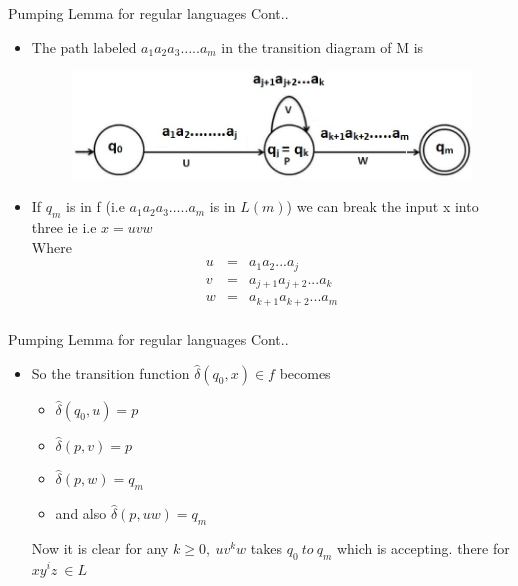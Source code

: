 \documentclass{beamer}
\begin{document}
\begin{frame}{Pumping Lemma for regular languages }
	\proofname Cont..\\
	\begin{itemize}
		\item The path labeled $a_1a_2a_3…..a_m $ in the transition diagram of M is 
		\begin{figure}
			\includegraphics[scale=.5]{img2/m9}
		\end{figure}
		\item If $q_m$ is in f (i.e $a_1a_2a_3…..a_m $ is in $L(m)$) we can break the input x into three ie i.e $x=uvw$\\Where	
		\begin{eqnarray*}
			u &=& a_1a_2...a_j\\
			v &=& a_{j+1}a_{j+2}...a_k\\
			w &=& a_{k+1}a_{k+2}...a_m\\
		\end{eqnarray*}

	\end{itemize}
\end{frame}
\begin{frame}{Pumping Lemma for regular languages }
	\proofname Cont..\\
	\begin{itemize}
		\item 	So the transition function $\hat{\delta}(q_0,x) \in f$  becomes 
		\begin{itemize}
			\item $\hat{\delta}(q_0,u) = p$ 
			\item $\hat{\delta}(p,v) = p$ 
			\item $\hat{\delta}(p,w) = q_m$ 
			\item and also $\hat{\delta}(p,uw) = q_m$ 
		\end{itemize}
		Now it is clear for any $k \geq 0 ,\  uv^kw $ takes $q_0\  to\  q_m$  which is accepting. there for $xy^iz\ \in L$
	\end{itemize}
\end{frame}
\end{document}
